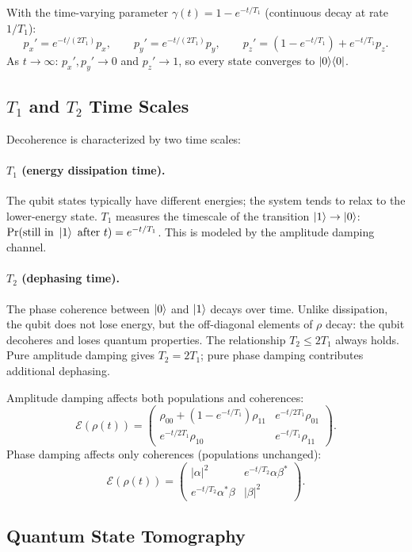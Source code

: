 \documentclass[10pt,a4paper]{article}
\begin{document}
With the time-varying parameter $\gamma(t)=1-e^{-t/T_1}$ (continuous decay at rate $1/T_1$):
\[
p_x'=e^{-t/(2T_1)}p_x,\qquad p_y'=e^{-t/(2T_1)}p_y,\qquad p_z'=(1-e^{-t/T_1})+e^{-t/T_1}p_z.
\]
As $t\to\infty$: $p_x',p_y'\to 0$ and $p_z'\to 1$, so every state converges to $\ket{0}\!\bra{0}$.

\subsection{$T_1$ and $T_2$ Time Scales}

Decoherence is characterized by two time scales:

\paragraph{$T_1$ (energy dissipation time).} The qubit states typically have different energies; the system tends to relax to the lower-energy state. $T_1$ measures the timescale of the transition $\ket{1}\to\ket{0}$: $\Pr(\text{still in }\ket{1}\text{ after }t)=e^{-t/T_1}$. This is modeled by the amplitude damping channel.

\paragraph{$T_2$ (dephasing time).} The phase coherence between $\ket{0}$ and $\ket{1}$ decays over time. Unlike dissipation, the qubit does not lose energy, but the off-diagonal elements of $\rho$ decay: the qubit decoheres and loses quantum properties. The relationship $T_2\le 2T_1$ always holds. Pure amplitude damping gives $T_2=2T_1$; pure phase damping contributes additional dephasing.

Amplitude damping affects both populations and coherences:
\[
\mathcal{E}(\rho(t))=\begin{pmatrix}\rho_{00}+(1-e^{-t/T_1})\rho_{11}&e^{-t/2T_1}\rho_{01}\\e^{-t/2T_1}\rho_{10}&e^{-t/T_1}\rho_{11}\end{pmatrix}.
\]
Phase damping affects only coherences (populations unchanged):
\[
\mathcal{E}(\rho(t))=\begin{pmatrix}|\alpha|^2&e^{-t/T_2}\alpha\beta^*\\e^{-t/T_2}\alpha^*\beta&|\beta|^2\end{pmatrix}.
\]

\subsection{Quantum State Tomography}
\end{document}
